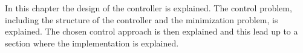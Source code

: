 \vspace{-6mm}
In this chapter the design of the controller is explained. The control problem, including the structure of the controller and the minimization problem, is explained. The chosen control approach is then explained and this lead up to a section where the implementation is explained. 
\vspace{-4mm}
%
%
%
